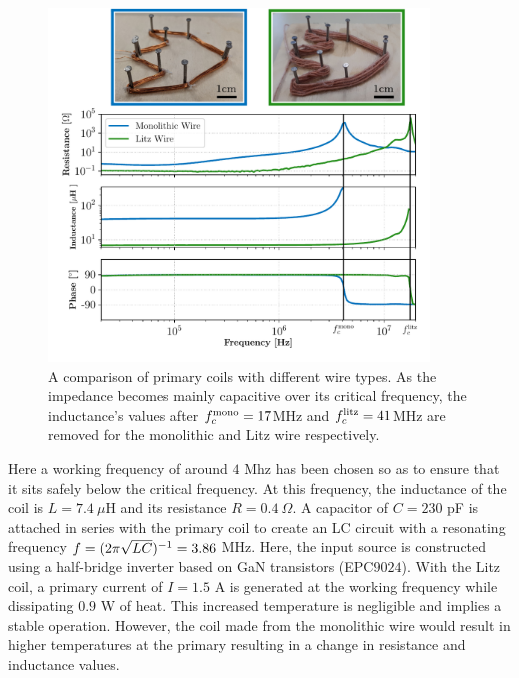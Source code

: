 \begin{figure}[t]
    \centering
    \includegraphics[width=0.9\textwidth]{images/chap5/impedance-analysis.pdf}
    \caption[A comparison of primary coils with different wire types]{A comparison of primary coils with different wire types. As the impedance becomes mainly capacitive over its critical frequency, the inductance's values after $f_c^\text{mono} = 17$MHz and $f_c^\text{litz}  = 41$MHz are removed for the monolithic and Litz wire respectively.}
    \label{fig:induction-coil-freq}
\end{figure}

Here a working frequency of around $4$ Mhz has been chosen so as to ensure that it sits safely below the critical frequency. At this frequency, the inductance of the coil is $L=7.4~\mu$H and its resistance $R=0.4~\Omega$. A capacitor of $C = 230$ pF is attached in series with the primary coil to create an LC circuit with a resonating frequency $f=(2\pi\sqrt{LC})^{-1} = 3.86$ MHz. Here, the input source is constructed using a half-bridge inverter based on GaN transistors (EPC$9024$). With the Litz coil, a primary current of $I= 1.5$ A is generated at the working frequency while dissipating $0.9$ W of heat. This increased temperature is negligible and implies a stable operation. However, the coil made from the monolithic wire would result in higher temperatures at the primary resulting in a change in resistance and inductance values.

